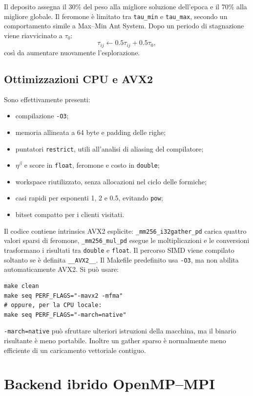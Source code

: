 \documentclass[11pt,a4paper]{article}
\begin{document}
Il deposito assegna il 30\% del peso alla migliore soluzione dell'epoca e il
70\% alla migliore globale. Il feromone è limitato tra \texttt{tau\_min} e
\texttt{tau\_max}, secondo un comportamento simile a Max--Min Ant System. Dopo
un periodo di stagnazione viene riavvicinato a $\tau_0$:
\[
  \tau_{ij}\leftarrow0.5\tau_{ij}+0.5\tau_0,
\]
così da aumentare nuovamente l'esplorazione.

\subsection{Ottimizzazioni CPU e AVX2}

Sono effettivamente presenti:
\begin{itemize}
  \item compilazione \texttt{-O3};
  \item memoria allineata a 64 byte e padding delle righe;
  \item puntatori \texttt{restrict}, utili all'analisi di aliasing del compilatore;
  \item $\eta^\beta$ e score in \texttt{float}, feromone e costo in \texttt{double};
  \item workspace riutilizzato, senza allocazioni nel ciclo delle formiche;
  \item casi rapidi per esponenti 1, 2 e 0.5, evitando \texttt{pow};
  \item bitset compatto per i clienti visitati.
\end{itemize}

Il codice contiene intrinsics AVX2 esplicite: \texttt{\_mm256\_i32gather\_pd}
carica quattro valori sparsi di feromone, \texttt{\_mm256\_mul\_pd} esegue le
moltiplicazioni e le conversioni trasformano i risultati tra \texttt{double} e
\texttt{float}. Il percorso SIMD viene compilato soltanto se è definita
\texttt{\_\_AVX2\_\_}. Il Makefile predefinito usa \texttt{-O3}, ma non abilita
automaticamente AVX2. Si può usare:
\begin{lstlisting}
make clean
make seq PERF_FLAGS="-mavx2 -mfma"
# oppure, per la CPU locale:
make seq PERF_FLAGS="-march=native"
\end{lstlisting}
\texttt{-march=native} può sfruttare ulteriori istruzioni della macchina, ma il
binario risultante è meno portabile. Inoltre un gather sparso è normalmente meno
efficiente di un caricamento vettoriale contiguo.

\section{Backend ibrido OpenMP--MPI}
\end{document}
